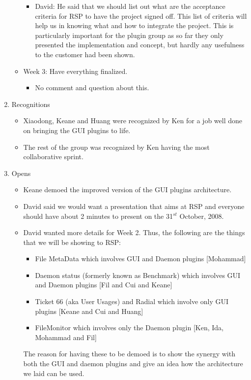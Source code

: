\documentclass{letter}
\begin{document}
\begin{enumerate}
\begin{itemize}
\begin{itemize}
                    \item David: He said that we should list out what are the acceptance criteria for RSP to have the project signed off. This list of criteria will help us in knowing what and how to integrate the project. This is particularly important for the plugin group as so far they only presented the implementation and concept, but hardly any usefulness to the customer had been shown.
                \end{itemize}
            \item Week 3: Have everything finalized.
                \begin{itemize}
                    \item No comment and question about this. 
                \end{itemize}
        \end{itemize}
    \item Recognitions
        \begin{itemize}
            \item Xiaodong, Keane and Huang were recognized by Ken for a job well done on bringing the GUI plugins to life. 
            \item The rest of the group was recognized by Ken having the most collaborative sprint.
        \end{itemize}
    \item Opens
        \begin{itemize}
            \item Keane demoed the improved version of the GUI plugins architecture.
            \item David said we would want a presentation that aims at RSP and everyone should have about 2 minutes to present on the 31$^{st}$ October, 2008. 
            \item David wanted more details for Week 2. Thus, the following are the things that we will be showing to RSP:
                \begin{itemize}
                    \item File MetaData which involves GUI and Daemon plugins [Mohammad]
                    \item Daemon status (formerly known as Benchmark) which involves GUI and Daemon plugins [Fil and Cui and Keane]
                    \item Ticket 66 (aka User Usages) and Radial which involve only GUI plugins [Keane and Cui and Huang]
                    \item FileMonitor which involves only the Daemon plugin [Ken, Ida, Mohammad and Fil]
                \end{itemize}
                
                The reason for having these to be demoed is to show the synergy with both the GUI and daemon plugins and give an idea how the architecture we laid can be used. 
        \end{itemize}
\end{enumerate} 
\end{document}
